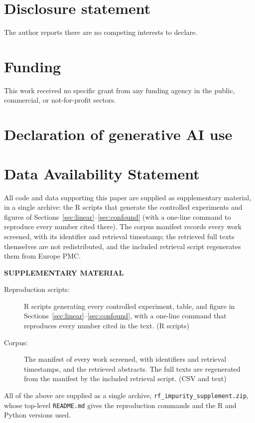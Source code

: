 \documentclass[12pt]{article}
\newcommand{\code}[1]{\texttt{#1}}
\begin{document}
\section*{Disclosure statement}

The author reports there are no competing interests to declare.

\section*{Funding}

This work received no specific grant from any funding agency in the public,
commercial, or not-for-profit sectors.

\section*{Declaration of generative AI use}



\section{Data Availability Statement}
\label{sec:availability}

All code and data supporting this paper are supplied as supplementary
material, in a single archive: the R scripts that generate the controlled
experiments and figures of Sections~\ref{sec:linear}--\ref{sec:confound} (with
a one-line command to reproduce every number cited there). The corpus manifest
records every work screened, with its identifier and retrieval timestamp; the
retrieved full texts themselves are not redistributed, and the included
retrieval script regenerates them from Europe PMC.

\label{supplementary-material}
\bigskip

\begin{center}

{\large\bf SUPPLEMENTARY MATERIAL}

\end{center}

\begin{description}
\item[Reproduction scripts:]
R scripts generating every controlled experiment, table, and figure in
Sections~\ref{sec:linear}--\ref{sec:confound}, with a one-line command that
reproduces every number cited in the text. (R scripts)
\item[Corpus:]
The manifest of every work screened, with identifiers and retrieval
timestamps, and the retrieved abstracts. The full texts are regenerated from
the manifest by the included retrieval script. (CSV and text)
\end{description}

All of the above are supplied as a single archive,
\code{rf\_impurity\_supplement.zip}, whose top-level \code{README.md} gives the
reproduction commands and the R and Python versions used.

\appendix



\end{document}
